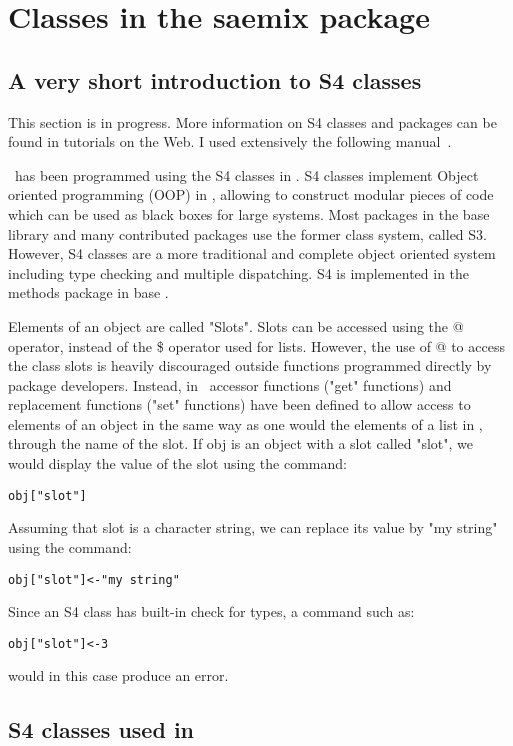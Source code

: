 
\section{Classes in the saemix package} \label{sec:techystuff}

\subsection{A very short introduction to S4 classes} \label{sec:introS4}

This section is in progress. More information on S4 classes and \R packages can be found in tutorials on the Web. I used extensively the following manual~\cite{Genolini}.

\monolix~has been programmed using the S4 classes in \R. S4 classes implement Object oriented programming (OOP) in \R, allowing to construct modular pieces of code which can be used as black boxes for large systems. Most packages in the base library and many contributed packages use the former class system, called S3. However, S4 classes are a more traditional and complete object oriented system including type checking and multiple dispatching. S4 is implemented in the methods package in base \R.

Elements of an object are called "Slots". Slots can be accessed using the @ operator, instead of the \$ operator used for lists. However, the use of @ to access the class slots is heavily discouraged outside functions programmed directly by package developers. Instead, in \monolix~accessor functions ("get" functions) and replacement functions ("set" functions) have been defined to allow access to elements of an object in the same way as one would the elements of a list in \R, through the name of the slot. If {\sf obj} is an object with a slot called "slot", we would display the value of the slot using the command:
\begin{verbatim}
obj["slot"]
\end{verbatim}
Assuming that slot is a character string, we can replace its value by "my string" using the command:
\begin{verbatim}
obj["slot"]<-"my string"
\end{verbatim}
Since an S4 class has built-in check for types, a command such as:
\begin{verbatim}
obj["slot"]<-3
\end{verbatim}
would in this case produce an error.

\subsection{S4 classes used in \monolix} \label{sec:saemixS4}

